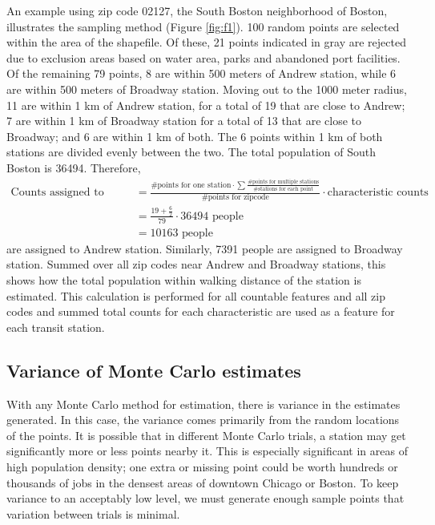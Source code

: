 \documentclass[11pt]{article}
\begin{document}
An example using zip code 02127, the South Boston neighborhood of Boston, illustrates the sampling method (Figure \ref{fig:f1}). 100 random points are selected within the area of the shapefile. Of these, 21 points indicated in gray are rejected due to exclusion areas based on water area, parks and abandoned port facilities. Of the remaining 79 points, 8 are within 500 meters of Andrew station, while 6 are within 500 meters of Broadway station. Moving out to the 1000 meter radius, 11 are within 1 km of Andrew station, for a total of 19 that are close to Andrew; 7 are within 1 km of Broadway station for a total of 13 that are close to Broadway; and 6 are within 1 km of both. The 6 points within 1 km of both stations are divided evenly between the two. The total population of South Boston is 36494. Therefore, 
\begin{align*}
\text{Counts assigned to station} &= \frac{\text{\# points for one station} \cdot \sum\frac{\text{\# points for multiple stations}}{\text{\# stations for each point}}}{\text{\# points for zipcode}}\cdot\text{characteristic counts}  \\
&= \frac{19 + \frac{6}{2}}{79}\cdot 36494 \text{ people} \\
&= 10163 \text{ people}
\end{align*}
are assigned to Andrew station. Similarly, 7391 people are assigned to Broadway station. Summed over all zip codes near Andrew and Broadway stations, this shows how the total population within walking distance of the station is estimated. This calculation is performed for all countable features and all zip codes and summed total counts for each characteristic are used as a feature for each transit station. 

\subsection{Variance of Monte Carlo estimates}

With any Monte Carlo method for estimation, there is variance in the estimates generated. In this case, the variance comes primarily from the random locations of the points. It is possible that in different Monte Carlo trials, a station may get significantly more or less points nearby it. This is especially significant in areas of high population density; one extra or missing point could be worth hundreds or thousands of jobs in the densest areas of downtown Chicago or Boston. To keep variance to an acceptably low level, we must generate enough sample points that variation between trials is minimal. 
\end{document}
